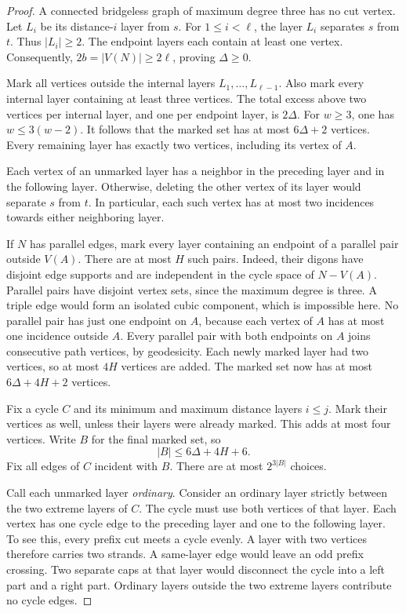 \begin{proof}
A connected bridgeless graph of maximum degree three has no cut vertex.
Let $L_i$ be its distance-$i$ layer from $s$.
For $1\le i<\ell$, the layer $L_i$ separates $s$ from $t$.
Thus $|L_i|\ge2$.
The endpoint layers each contain at least one vertex.
Consequently, $2b=|V(N)|\ge2\ell$, proving $\Delta\ge0$.

Mark all vertices outside the internal layers $L_1,\ldots,L_{\ell-1}$.
Also mark every internal layer containing at least three vertices.
The total excess above two vertices per internal layer, and one per endpoint layer, is $2\Delta$.
For $w\ge3$, one has $w\le3(w-2)$.
It follows that the marked set has at most $6\Delta+2$ vertices.
Every remaining layer has exactly two vertices, including its vertex of $A$.

Each vertex of an unmarked layer has a neighbor in the preceding layer and in the following layer.
Otherwise, deleting the other vertex of its layer would separate $s$ from $t$.
In particular, each such vertex has at most two incidences towards either neighboring layer.

If $N$ has parallel edges, mark every layer containing an endpoint of a parallel pair outside $V(A)$.
There are at most $H$ such pairs.
Indeed, their digons have disjoint edge supports and are independent in the cycle space of $N-V(A)$.
Parallel pairs have disjoint vertex sets, since the maximum degree is three.
A triple edge would form an isolated cubic component, which is impossible here.
No parallel pair has just one endpoint on $A$, because each vertex of $A$ has at most one incidence outside $A$.
Every parallel pair with both endpoints on $A$ joins consecutive path vertices, by geodesicity.
Each newly marked layer had two vertices, so at most $4H$ vertices are added.
The marked set now has at most $6\Delta+4H+2$ vertices.

Fix a cycle $C$ and its minimum and maximum distance layers $i\le j$.
Mark their vertices as well, unless their layers were already marked.
This adds at most four vertices.
Write $B$ for the final marked set, so
\[
 |B|\le6\Delta+4H+6.
\]
Fix all edges of $C$ incident with $B$.
There are at most $2^{3|B|}$ choices.

Call each unmarked layer \emph{ordinary}.
Consider an ordinary layer strictly between the two extreme layers of $C$.
The cycle must use both vertices of that layer.
Each vertex has one cycle edge to the preceding layer and one to the following layer.
To see this, every prefix cut meets a cycle evenly.
A layer with two vertices therefore carries two strands.
A same-layer edge would leave an odd prefix crossing.
Two separate caps at that layer would disconnect the cycle into a left part and a right part.
Ordinary layers outside the two extreme layers contribute no cycle edges.


\end{proof}

